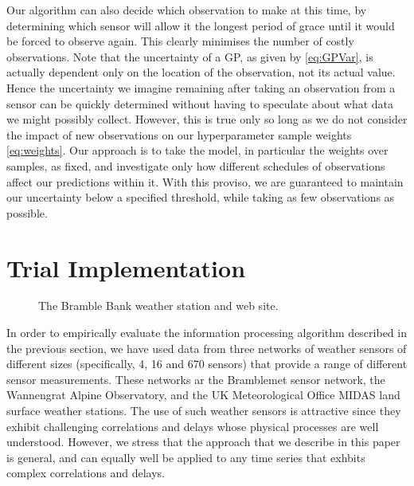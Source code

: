 \documentclass{acmtrans2m}
\begin{document}
Our algorithm can also decide which observation to make at this time, by determining which sensor will allow it the longest period of grace until it would be forced to observe again. This clearly minimises the number of costly observations. Note that the uncertainty of a GP, as given by \eqref{eq:GPVar}, is actually dependent only on the location of the observation, not its actual value. Hence the uncertainty we imagine remaining after taking an observation from a sensor can be quickly determined without having to speculate about what data we might possibly collect. However, this is true only so long as we do not consider the impact of new observations on our hyperparameter sample weights \eqref{eq:weights}. Our approach is to take the model, in particular the weights over samples, as fixed, and investigate only how different schedules of observations affect our predictions within it. With this proviso, we are guaranteed to maintain our uncertainty below a specified threshold, while taking as few observations as possible.

\section{Trial Implementation}\label{sec_implementation}

\begin{figure}
\begin{center}
 \hspace{0.25cm}
\caption{The Bramble Bank weather station and web site.}
\label{bramble_sensor}
\end{center}
\end{figure}

\noindent In order to empirically evaluate the information processing algorithm described in the previous section, we have used data from three networks of weather sensors of different sizes (specifically, 4, 16 and 670 sensors) that provide a range of different sensor measurements. These networks ar the Bramblemet sensor network, the Wannengrat Alpine Observatory, and the UK Meteorological Office MIDAS land surface weather stations. The use of such weather sensors is attractive since they exhibit challenging correlations and delays whose physical processes are well understood. However, we stress that the approach that we describe in this paper is general, and can equally well be applied to any time series that exhbits complex correlations and delays.
\end{document}
